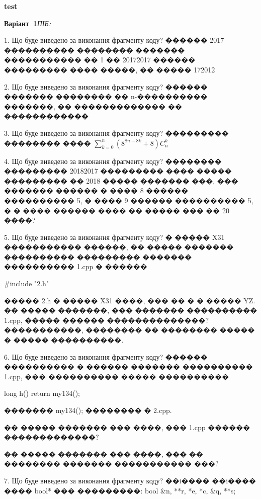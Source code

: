 \documentclass[11pt]{article}
\begin{document}
{\large\textbf{test}}

\textbf{Варіант \No\,1}\hfill \textit{ПІБ:}\,\underline{\hspace{60mm}}
\vspace{4mm}

1. Що буде виведено за виконання фрагменту коду?
������ 2017-���������� �������� ������� ����������� �� 1 �� 20172017 ������ ��������� ���� �����, �� ����� 172012

2. Що буде виведено за виконання фрагменту коду?
������ ������� �������� �� n-���������� �������, �� ������������� �� ������������

3. Що буде виведено за виконання фрагменту коду?
��������� �������� ���� {$\sum\limits_{k=0}^{n} \left({{8^{8n+8k}}+8}\right){C_n^k}$}

4. Що буде виведено за виконання фрагменту коду?
�������� ��������� 20182017 ��������� ���� ����� ��������� �� 2018 ����� ������� ���, ��� ������� ������ � ���� 8 ������ ���������� 5, � ���� 9 ������ ���������� 5, � � ���� ������ ���� �� ����� ��� �� 20 ����?

5. Що буде виведено за виконання фрагменту коду?
� ����� X31 ����������� ������, �� ����� ������� ���������� ��������� ������� ���������� 1.cpp � ������\par
{\#}include "2.h"
\par����� 2.h � ����� X31 ����, ��� �� � � ����� YZ. �� ����� �������, ��� ������� ���������� 1.cpp, ����� ������ ��������������?�����������, �������� �� �������� ����� � ����� ����������.\par\vspace{1.5cm}

6. Що буде виведено за виконання фрагменту коду?
������ ���������� � ������ ������� ���������� 1.cpp, ��� ���������� ����� ����������\par
long h(){ return my134();}\par
������� my134(); �������� � 2.cpp.\par
�� ����� ������� ��� ����, ��� 1.cpp ������ �������������?\par\vspace{1.5cm}
�� ����� ������� ��� ����, ��� �� �������� ������� ����������� ���?\par


7. Що буде виведено за виконання фрагменту коду?
��i���� ��i���� ���� bool* ��� ���������: bool &n, **r, *e, *c, &q, **s;
\end{document}
